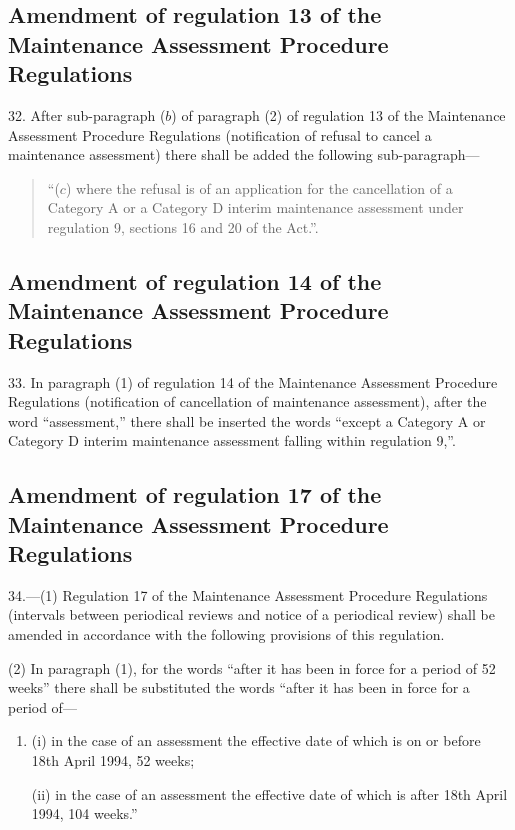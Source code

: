 \documentclass[12pt,a4paper]{article}
\begin{document}
\subsection[32. Amendment of regulation 13 of the Maintenance Assessment Procedure Regulations]{Amendment of regulation 13 of the Maintenance Assessment Procedure Regulations}

32.  After sub-paragraph ($b$) of paragraph (2) of regulation 13 of the Maintenance Assessment Procedure Regulations (notification of refusal to cancel a maintenance assessment) there shall be added the following sub-paragraph—
\begin{quotation}
“($c$) where the refusal is of an application for the cancellation of a Category A or a Category D interim maintenance assessment under regulation 9, sections 16 and 20 of the Act.”.
\end{quotation}

\subsection[33. Amendment of regulation 14 of the Maintenance Assessment Procedure Regulations]{Amendment of regulation 14 of the Maintenance Assessment Procedure Regulations}

33.  In paragraph (1) of regulation 14 of the Maintenance Assessment Procedure Regulations (notification of cancellation of maintenance assessment), after the word “assessment,” there shall be inserted the words “except a Category A or Category D interim maintenance assessment falling within regulation 9,”.

\subsection[34. Amendment of regulation 17 of the Maintenance Assessment Procedure Regulations]{Amendment of regulation 17 of the Maintenance Assessment Procedure Regulations}

34.—(1) Regulation 17 of the Maintenance Assessment Procedure Regulations (intervals between periodical reviews and notice of a periodical review) shall be amended in accordance with the following provisions of this regulation.

(2) In paragraph (1), for the words “after it has been in force for a period of 52 weeks” there shall be substituted the words “after it has been in force for a period of—
\begin{enumerate}\item[]
(i) in the case of an assessment the effective date of which is on or before 18th April 1994, 52 weeks;

(ii) in the case of an assessment the effective date of which is after 18th April 1994, 104 weeks.”
\end{enumerate}
\end{document}
